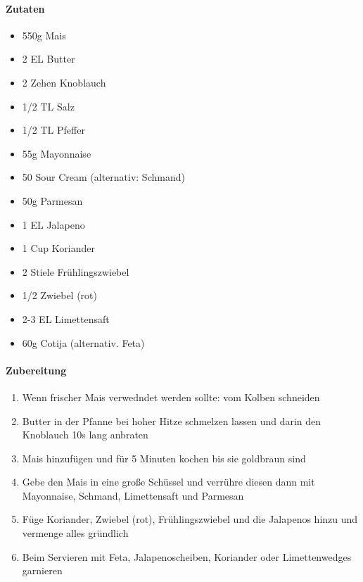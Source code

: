 \newpage
{}
\paragraph{Zutaten}
\begin{itemize}[noitemsep]
	\item 550g Mais
	\item 2 EL Butter
	\item 2 Zehen Knoblauch
	\item 1/2 TL Salz
	\item 1/2 TL Pfeffer
	\item 55g Mayonnaise
	\item 50 Sour Cream (alternativ: Schmand)
	\item 50g Parmesan
	\item 1 EL Jalapeno
	\item 1 Cup Koriander
	\item 2 Stiele Frühlingszwiebel
	\item 1/2 Zwiebel (rot)
	\item 2-3 EL Limettensaft
	\item 60g Cotija (alternativ. Feta)
\end{itemize}

\paragraph{Zubereitung}
\begin{enumerate}
    \item Wenn frischer Mais verwedndet werden sollte: vom Kolben schneiden
    \item Butter in der Pfanne bei hoher Hitze schmelzen lassen und darin den Knoblauch 10s lang anbraten
    \item Mais hinzufügen und für 5 Minuten kochen bis sie goldbraun sind
    \item Gebe den Mais in eine große Schüssel und verrühre diesen dann mit Mayonnaise, Schmand, Limettensaft und Parmesan
    \item Füge Koriander, Zwiebel (rot), Frühlingszwiebel und die Jalapenos hinzu und vermenge alles gründlich
    \item Beim Servieren mit Feta, Jalapenoscheiben, Koriander oder Limettenwedges garnieren
\end{enumerate}